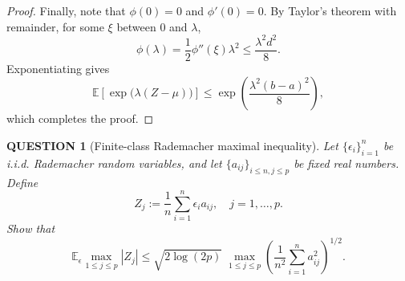 \documentclass[12pt]{article}
\renewcommand{\(}{\left(}%
\renewcommand{\)}{\right)}%
\renewcommand{\[}{\left[}%
\renewcommand{\]}{\right]}%
\newtheorem{question}{QUESTION}[section]}
\newtheorem{proof}{Proof.}}
\begin{document}
\begin{proof}
Finally, note that $\phi(0)=0$ and $\phi'(0)=0$. By Taylor's theorem with remainder, for some $\xi$ between $0$ and $\lambda$,
\begin{equation*}
\phi(\lambda)
=
\frac{1}{2}\phi''(\xi)\lambda^2
\le
\frac{\lambda^2 d^2}{8}.
\end{equation*}
Exponentiating gives
\begin{equation*}
\mathbb{E}\!\left[\exp\big(\lambda(Z-\mu)\big)\right]
\le
\exp\!\left(\frac{\lambda^2 (b-a)^2}{8}\right),
\end{equation*}
which completes the proof.
\end{proof}

\begin{question}[Finite-class Rademacher maximal inequality]
Let $\{\epsilon_i\}_{i=1}^n$ be i.i.d. Rademacher random variables, and let $\{a_{ij}\}_{i\le n, j\le p}$ be fixed real numbers. Define
\begin{equation*}
Z_j := \frac{1}{n}\sum_{i=1}^n \epsilon_i a_{ij}, \quad j=1,\dots,p.
\end{equation*}
Show that
\begin{equation*}
\mathbb{E}_\epsilon \max_{1\le j\le p} |Z_j|
\le
\sqrt{2\log(2p)}\;
\max_{1\le j\le p}
\left(\frac{1}{n^2}\sum_{i=1}^n a_{ij}^2\right)^{1/2}.
\end{equation*}
\end{question}
\end{document}
